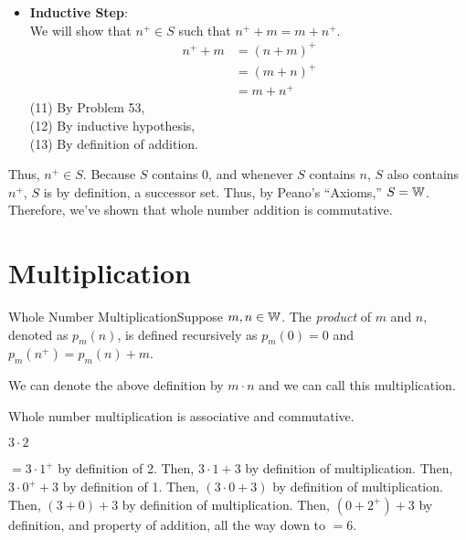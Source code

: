 {\begin{itemize}
                    \item \textbf{Inductive Step}: \\
                    We will show that \(n^+\in S\) such that \(n^+ + m = m + n^+\). 
                    \begin{align}
                        n^+ + m &= (n + m)^+ \\
                        &= (m + n)^+ \\
                        &= m + n^+
                    \end{align}
                    (11) By Problem 53, \\
                    (12) By inductive hypothesis, \\
                    (13) By definition of addition.                    
                \end{itemize}
                 Thus, \(n^+ \in S\). Because \(S\) contains 0, and whenever \(S\) contains \(n\), \(S\) also contains \(n^+\), \(S\) is by definition, a successor set. Thus, by Peano's ``Axioms,'' \(S = \mathbb{W}\). Therefore, we've shown that whole number addition is commutative.
            }

    \section{Multiplication}

        \begin{definition}
            {Whole Number Multiplication}Suppose \(m,n \in \mathbb{W}\). The \textit{product} of \(m\) and \(n\), denoted as \(p_m(n)\), is defined recursively as \(p_m(0) = 0\) and \(p_m(n^+) = p_m(n) + m\).

            We can denote the above definition by \(m\cdot n\) and we can call this multiplication.
        \end{definition}

            \begin{theorem}
                Whole number multiplication is associative and commutative. 
            \end{theorem}


        \begin{example}
            \(3\cdot 2\)
        \end{example}
        \noindent\(= 3 \cdot 1^+\) by definition of 2. Then, \(3\cdot 1 + 3\) by definition of multiplication. Then, \(3\cdot 0^+ + 3\) by definition of 1. Then, \((3\cdot 0 + 3)\) by definition of multiplication. Then, \((3 + 0) + 3\) by definition of multiplication. Then, \((0 + 2^+) + 3\) by definition, and property of addition, all the way down to \(=6\).

